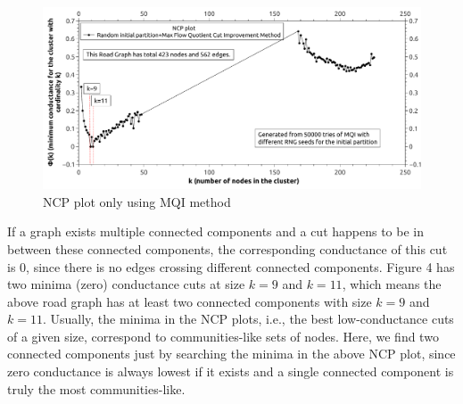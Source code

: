 \documentclass[12pt]{article}
\begin{document}
\begin{figure}[h]
\begin{center}
\includegraphics[scale=0.45]{MQI_only.pdf}
\caption{NCP plot only using MQI method}
\end{center}
\end{figure}

If a graph exists multiple connected components and a cut happens to be in between these connected components, the corresponding conductance of this cut is $0$, since there is no edges crossing different connected components. Figure 4 has two minima (zero) conductance cuts at size $k=9$ and $k=11$, which means the above road graph has at least two connected components with size $k=9$ and $k=11$. Usually, the minima in the NCP plots, i.e., the best low-conductance cuts of a given size, correspond to communities-like sets of nodes. Here, we find two connected components just by searching the minima in the above NCP plot, since zero conductance is always lowest if it exists and a single connected component is truly the most communities-like. 
\end{document}
